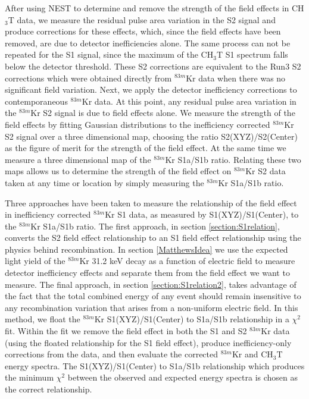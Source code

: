 After using NEST to determine and remove the strength of the field effects in CH$_3$T data, we measure the residual pulse area variation in the S2 signal and produce corrections for these effects, which, since the field effects have been removed, are due to detector inefficiencies alone.  The same process can not be repeated for the S1 signal, since the maximum of the CH$_3$T S1 spectrum falls below the detector threshold.  These S2 corrections are equivalent to the Run3 S2 corrections which were obtained directly from $^{83m}$Kr data when there was no significant field variation.  Next, we apply the detector inefficiency corrections to contemporaneous $^{83m}$Kr data.  At this point, any residual pulse area variation in the $^{83m}$Kr S2 signal is due to field effects alone.  We measure the strength of the field effects by fitting Gaussian distributions to the inefficiency corrected $^{83m}$Kr S2 signal over a three dimensional map, choosing the ratio S2(XYZ)/S2(Center) as the figure of merit for the strength of the field effect.  At the same time we measure a three dimensional map of the $^{83m}$Kr S1a/S1b ratio.  Relating these two maps allows us to determine the strength of the field effect on $^{83m}$Kr S2 data taken at any time or location by simply measuring the $^{83m}$Kr S1a/S1b ratio. 

Three approaches have been taken to measure the relationship of the field effect in inefficiency corrected $^{83m}$Kr S1 data, as measured by S1(XYZ)/S1(Center), to the $^{83m}$Kr S1a/S1b ratio.  The first approach, in section \ref{section:S1relation}, converts the S2 field effect relationship to an S1 field effect relationship using the physics behind recombination.  In section \ref{MatthewsIdea} we use the expected light yield of the $^{83m}$Kr 31.2 keV decay as a function of electric field to measure detector inefficiency effects and separate them from the field effect we want to measure.  The final approach, in section \ref{section:S1relation2}, takes advantage of the fact that the total combined energy of any event should remain insensitive to any recombination variation that arises from a non-uniform electric field.  In this method, we float the $^{83m}$Kr S1(XYZ)/S1(Center) to S1a/S1b relationship in a $\chi^2$ fit.  Within the fit we remove the field effect in both the S1 and S2 $^{83m}$Kr data (using the floated relationship for the S1 field effect), produce inefficiency-only corrections from the data, and then evaluate the corrected $^{83m}$Kr and CH$_3$T energy spectra.  The  S1(XYZ)/S1(Center) to S1a/S1b relationship which produces the minimum $\chi^2$ between the observed and expected energy spectra is chosen as the correct relationship.

